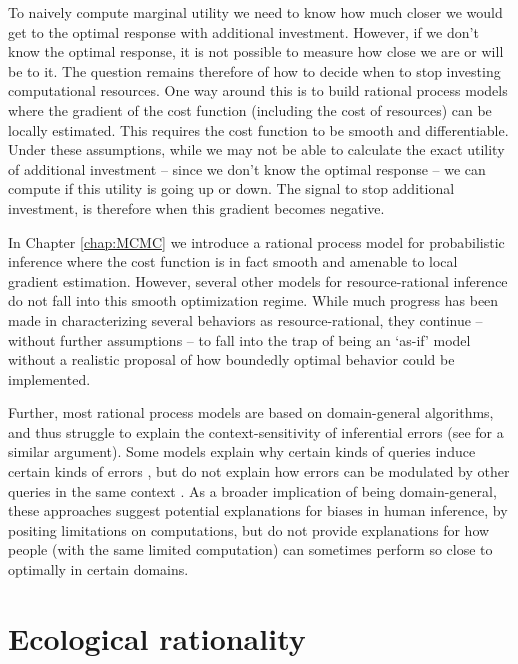 To naively compute marginal utility we need to know how much closer we would get to the optimal response with additional investment. However, if we don't know the optimal response, it is not possible to measure how close we are or will be to it. The question remains therefore of how to decide when to stop investing computational resources. One way around this is to build rational process models where the gradient of the cost function (including the cost of resources) can be locally estimated. This requires the cost function to be smooth and differentiable. Under these assumptions, while we may not be able to calculate the exact utility of additional investment -- since we don't know the optimal response -- we can compute if this utility is going up or down. The signal to stop additional investment, is therefore when this gradient becomes negative.

In Chapter \ref{chap:MCMC} we introduce a rational process model for probabilistic inference where the cost function is in fact smooth and amenable to local gradient estimation. However, several other models for resource-rational inference do not fall into this smooth optimization regime. While much progress has been made in characterizing several behaviors as resource-rational, they continue -- without further assumptions -- to fall into the trap of being an `as-if' model without a realistic proposal of how boundedly optimal behavior could be implemented. 

Further, most rational process models are based on domain-general algorithms, and thus struggle to explain the context-sensitivity of inferential errors (see \citet{mercier2017enigma} for a similar argument). Some models explain why certain kinds of queries induce certain kinds of errors \citep{dasgupta2017hypotheses}, but do not explain how errors can be modulated by other queries in the same context \citep{gershman2014amortized,dasgupta2018remembrance}. As a broader implication of being domain-general, these approaches suggest potential explanations for biases in human inference, by positing limitations on computations, but do not provide explanations for how people (with the same limited computation) can sometimes perform so close to optimally in certain domains.

\section{Ecological rationality}


